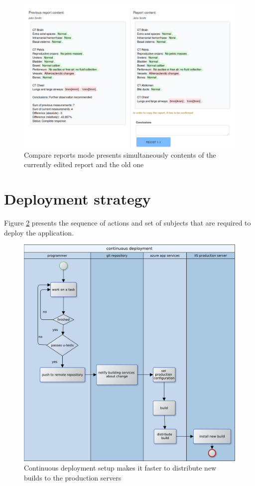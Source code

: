 \documentclass[12pt, twoside, openany]{report}
\theoremstyle{definition}
\begin{document}
\begin{figure}
	\centering
	\includegraphics[width=\linewidth]{compare-reports}
	\caption{Compare reports mode presents simultaneously contents of the currently edited report and the old one
		\label{fig:compare-report}
	}
\end{figure}

\section{Deployment strategy}

Figure \ref{fig:continuous-deployment} presents the sequence of actions and set of subjects that are required to deploy the application.
\begin{figure}
	\centering
	\includegraphics[width=\linewidth]{continuous-deployment}
	\caption{Continuous deployment setup makes it faster to distribute new builds to the production servers
		\label{fig:continuous-deployment}
	}
\end{figure}
\end{document}
